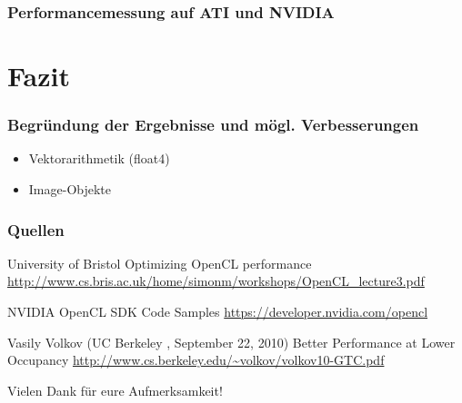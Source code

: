 \documentclass{beamer}
\begin{document}
\begin{frame}
\frametitle{Performancemessung auf ATI und NVIDIA}
\end{frame}


\section{Fazit}
\begin{frame}
\frametitle{Begr\"undung der Ergebnisse und m\"ogl. Verbesserungen}

\begin{itemize}
\item Vektorarithmetik (float4)
\item Image-Objekte
\end{itemize}

 
\end{frame}














\begin{frame}
\frametitle{Quellen}


\footnotesize{
\begin{thebibliography}{99}
  University of Bristol
 \newblock Optimizing OpenCL performance
 \newblock \url{http://www.cs.bris.ac.uk/home/simonm/workshops/OpenCL_lecture3.pdf} 
\end{thebibliography}
}



\footnotesize{
\begin{thebibliography}{99}
 NVIDIA 
 \newblock OpenCL SDK Code Samples
 \newblock \url{https://developer.nvidia.com/opencl} 
\end{thebibliography}
}


\footnotesize{
\begin{thebibliography}{99}
  Vasily Volkov
(UC Berkeley , September 22, 2010)
 \newblock Better Performance at Lower Occupancy 
 \newblock \url{http://www.cs.berkeley.edu/~volkov/volkov10-GTC.pdf} 
\end{thebibliography}
}





\end{frame}
 
 
 
\begin{frame}
\centerline{Vielen Dank f{\"u}r eure Aufmerksamkeit!}
\end{frame}
\end{document}

